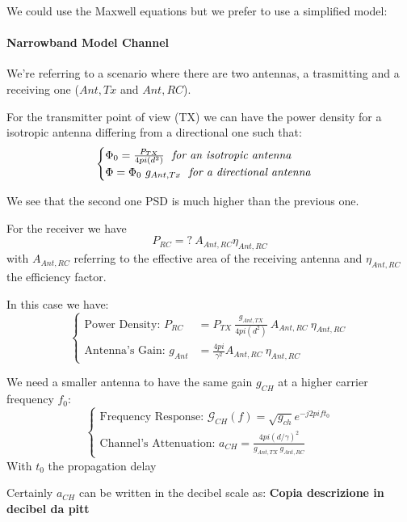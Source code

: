 We could use the Maxwell equations but we prefer to use a simplified model:
\paragraph{Narrowband Model Channel}
We're referring to a scenario where there are two antennas, a trasmitting and a receiving one ($Ant,Tx$ and $Ant,RC$).

For the transmitter point of view (TX) we can have the power density for a isotropic antenna differing from a directional one such that:
\begin{equation}
\begin{cases}
\Phi_0 = \frac{P_{TX}}{4pi(d^2)} \ \text{ \textit{for an isotropic antenna}}\\
\Phi = \Phi_0 \ g_{Ant,Tx} \ \text{ \textit{for a directional antenna}}
\end{cases}
\end{equation}

We see that the second one PSD is much higher than the previous one. 

For the receiver we have 
\begin{equation}
P_{RC} = ? \ A_{Ant,RC} \eta_{Ant,RC}
\end{equation}
with $A_{Ant,RC}$ referring to the effective area of the receiving antenna and $\eta_{Ant,RC}$ the efficiency factor. 

In this case we have:
\begin{equation}
\begin{cases}
\text{Power Density: } P_{RC} &= P_{TX}\ \frac{g_{Ant,TX}}{4pi(d^2)}\ A_{Ant,RC}\ \eta_{Ant,RC}\\
\text{Antenna's Gain: } g_{Ant} &= \frac{4pi}{\gamma^2} A_{Ant,RC} \ \eta_{Ant,RC}
\end{cases}
\end{equation} 

We need a smaller antenna to have the same gain $g_{CH}$ at a higher carrier frequency $f_0$:
\begin{equation}
\begin{cases}
\text{Frequency Response: } \mathcal{G}_{CH} (f) = \sqrt{g_{ch}} e^{-j2pif{t_0}}\\
\text{Channel's Attenuation: } a_{CH} = \frac{4pi(d/\gamma)^2}{g_{Ant,TX}\ g_{Ant,RC}}
\end{cases}
\end{equation}
With $t_0$ the propagation delay 

Certainly $a_{CH}$ can be written in the decibel scale as:
\textbf{Copia descrizione in decibel da pitt}

